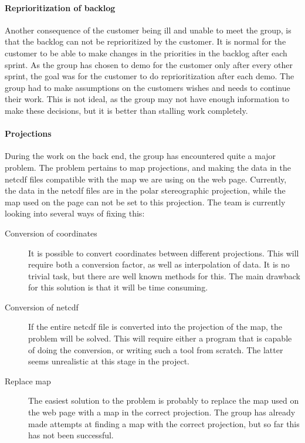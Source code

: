 \documentclass[11pt,a4paper,titlepage,oneside]{report}
\begin{document}
\paragraph{Reprioritization of backlog}
Another consequence of the customer being ill and unable to meet the group, is that the backlog can not be reprioritized by the customer. It is normal for the customer to be able to make changes in the priorities in the backlog after each sprint. As the group has chosen to demo for the customer only after every other sprint, the goal was for the customer to do reprioritization after each demo. The group had to make assumptions on the customers wishes and needs to continue their work. This is not ideal, as the group may not have enough information to make these decisions, but it is better than stalling work completely. 

\paragraph{Projections}
During the work on the back end, the group has encountered quite a major problem. The problem pertains to map projections, and making the data in the \gls{netcdf} files compatible with the map we are using on the web page. Currently, the data in the \gls{netcdf} files are in the polar stereographic projection, while the map used on the page can not be set to this projection. The team is currently looking into several ways of fixing this:

\begin{description}
\item[Conversion of coordinates] It is possible to convert coordinates between different projections. This will require both a conversion factor, as well as interpolation of data. It is no trivial task, but there are well known methods for this. The main drawback for this solution is that it will be time consuming. 
\item[Conversion of \gls{netcdf}] If the entire \gls{netcdf} file is converted into the projection of the map, the problem will be solved. This will require either a program that is capable of doing the conversion, or writing such a tool from scratch. The latter seems unrealistic at this stage in the project.
\item[Replace map] The easiest solution to the problem is probably to replace the map used on the web page with a map in the correct projection. The group has already made attempts at finding a map with the correct projection, but so far this has not been successful.
\end{description}
\end{document}
